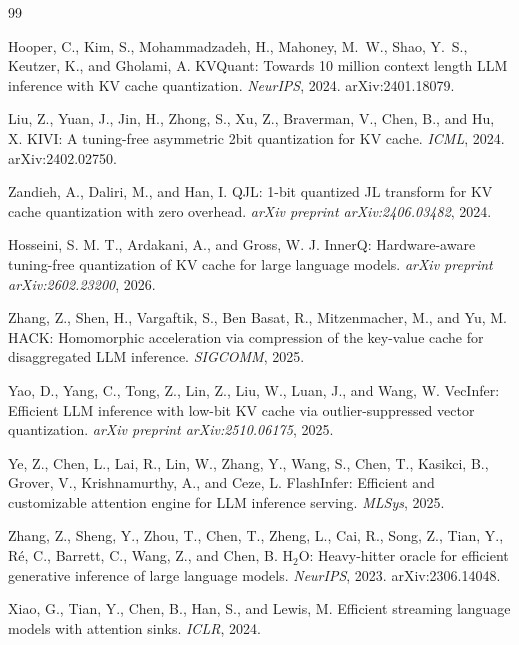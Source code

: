 \documentclass[10pt,twocolumn,a4paper]{article}
\theoremstyle{definition}
\theoremstyle{remark}
\begin{document}
\begin{thebibliography}{99}

Hooper, C., Kim, S., Mohammadzadeh, H., Mahoney, M.~W., Shao, Y.~S., Keutzer, K., and Gholami, A.
\newblock KVQuant: Towards 10 million context length LLM inference with KV cache quantization.
\newblock \emph{NeurIPS}, 2024.
\newblock arXiv:2401.18079.

Liu, Z., Yuan, J., Jin, H., Zhong, S., Xu, Z., Braverman, V., Chen, B., and Hu, X.
\newblock KIVI: A tuning-free asymmetric 2bit quantization for KV cache.
\newblock \emph{ICML}, 2024.
\newblock arXiv:2402.02750.

Zandieh, A., Daliri, M., and Han, I.
\newblock QJL: 1-bit quantized JL transform for KV cache quantization with zero overhead.
\newblock \emph{arXiv preprint arXiv:2406.03482}, 2024.

Hosseini, S. M. T., Ardakani, A., and Gross, W. J.
\newblock InnerQ: Hardware-aware tuning-free quantization of KV cache for large language models.
\newblock \emph{arXiv preprint arXiv:2602.23200}, 2026.

Zhang, Z., Shen, H., Vargaftik, S., Ben Basat, R., Mitzenmacher, M., and Yu, M.
\newblock HACK: Homomorphic acceleration via compression of the key-value cache for disaggregated LLM inference.
\newblock \emph{SIGCOMM}, 2025.

Yao, D., Yang, C., Tong, Z., Lin, Z., Liu, W., Luan, J., and Wang, W.
\newblock VecInfer: Efficient LLM inference with low-bit KV cache via outlier-suppressed vector quantization.
\newblock \emph{arXiv preprint arXiv:2510.06175}, 2025.

Ye, Z., Chen, L., Lai, R., Lin, W., Zhang, Y., Wang, S., Chen, T., Kasikci, B., Grover, V., Krishnamurthy, A., and Ceze, L.
\newblock FlashInfer: Efficient and customizable attention engine for LLM inference serving.
\newblock \emph{MLSys}, 2025.

Zhang, Z., Sheng, Y., Zhou, T., Chen, T., Zheng, L., Cai, R., Song, Z., Tian, Y., R\'{e}, C., Barrett, C., Wang, Z., and Chen, B.
\newblock H$_2$O: Heavy-hitter oracle for efficient generative inference of large language models.
\newblock \emph{NeurIPS}, 2023.
\newblock arXiv:2306.14048.

Xiao, G., Tian, Y., Chen, B., Han, S., and Lewis, M.
\newblock Efficient streaming language models with attention sinks.
\newblock \emph{ICLR}, 2024.


\end{thebibliography}
\end{document}
